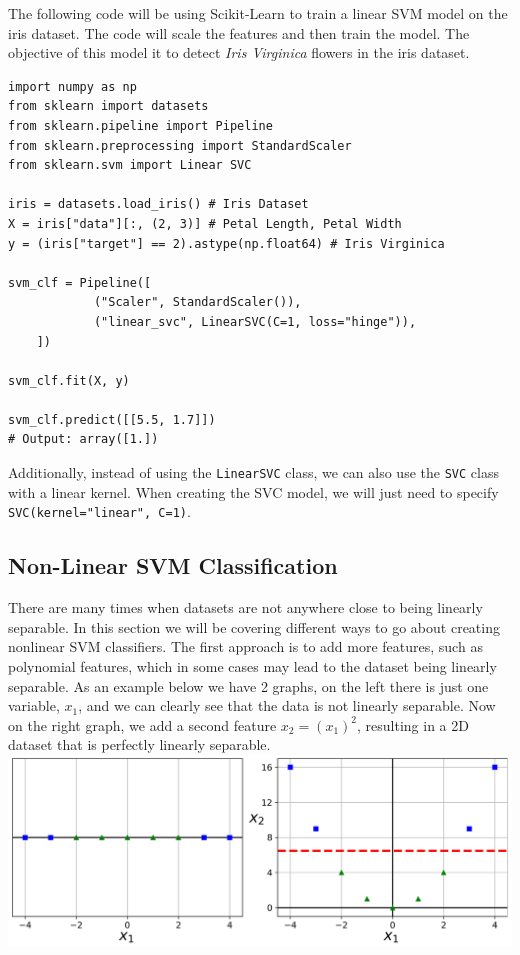 The following code will be using Scikit-Learn to train a linear SVM model on the iris dataset. The code will scale 
the features and then train the model. The objective of this model it to detect \textit{Iris Virginica} flowers in
the iris dataset. 

\begin{verbatim}
import numpy as np
from sklearn import datasets
from sklearn.pipeline import Pipeline
from sklearn.preprocessing import StandardScaler
from sklearn.svm import Linear SVC

iris = datasets.load_iris() # Iris Dataset
X = iris["data"][:, (2, 3)] # Petal Length, Petal Width
y = (iris["target"] == 2).astype(np.float64) # Iris Virginica

svm_clf = Pipeline([
            ("Scaler", StandardScaler()),
            ("linear_svc", LinearSVC(C=1, loss="hinge")),
    ])

svm_clf.fit(X, y)

svm_clf.predict([[5.5, 1.7]])
# Output: array([1.])
\end{verbatim}

\noindent
Additionally, instead of using the \texttt{LinearSVC} class, we can also use the \texttt{SVC}
class with a linear kernel. When creating the SVC model, we will just need to specify \texttt{SVC(kernel="linear", C=1)}.

\subsection{Non-Linear SVM Classification}

There are many times when datasets are not anywhere close to being linearly separable. In this section we will be covering different
ways to go about creating nonlinear SVM classifiers. The first approach is to add more features, such as polynomial features, which
in some cases may lead to the dataset being linearly separable. As an example below we have 2 graphs, on the left there is just one 
variable, $x_{1}$, and we can clearly see that the data is not linearly separable. Now on the right graph, we add a second feature
$x_{2} = (x_{1})^{2}$, resulting in a 2D dataset that is perfectly linearly separable. \\

\includegraphics[scale=0.45]{Images/linearSeparable.PNG}

